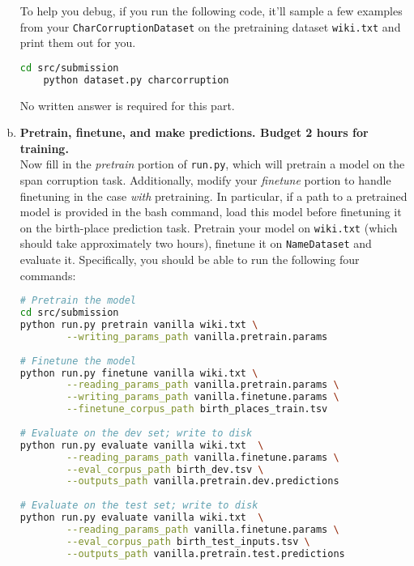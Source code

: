 \begin{enumerate}[(a)]
To help you debug, if you run the following code, it'll sample a few examples from your \texttt{CharCorruptionDataset} on the pretraining dataset \texttt{wiki.txt} and print them out for you.
\begin{lstlisting}[language=bash]
    cd src/submission
    python dataset.py charcorruption
\end{lstlisting}

No written answer is required for this part.

\item {} \textbf{Pretrain, finetune, and make predictions. Budget 2 hours for training.}\\
Now fill in the \textit{pretrain} portion of \texttt{run.py}, which will pretrain a model on the span corruption task. Additionally, modify your \textit{finetune} portion to handle finetuning in the case \textit{with} pretraining. In particular, if a path to a pretrained model is provided in the bash command, load this model before finetuning it on the birth-place prediction task.
Pretrain your model on \texttt{wiki.txt} (which should take approximately two hours), finetune it on \texttt{NameDataset} and evaluate it. Specifically, you should be able to run the following four commands:

\begin{lstlisting}[language=bash]
# Pretrain the model
cd src/submission
python run.py pretrain vanilla wiki.txt \
        --writing_params_path vanilla.pretrain.params
        
# Finetune the model
python run.py finetune vanilla wiki.txt \
        --reading_params_path vanilla.pretrain.params \
        --writing_params_path vanilla.finetune.params \
        --finetune_corpus_path birth_places_train.tsv
        
# Evaluate on the dev set; write to disk
python run.py evaluate vanilla wiki.txt  \
        --reading_params_path vanilla.finetune.params \
        --eval_corpus_path birth_dev.tsv \
        --outputs_path vanilla.pretrain.dev.predictions
        
# Evaluate on the test set; write to disk
python run.py evaluate vanilla wiki.txt  \
        --reading_params_path vanilla.finetune.params \
        --eval_corpus_path birth_test_inputs.tsv \
        --outputs_path vanilla.pretrain.test.predictions
\end{lstlisting}


\end{enumerate}
